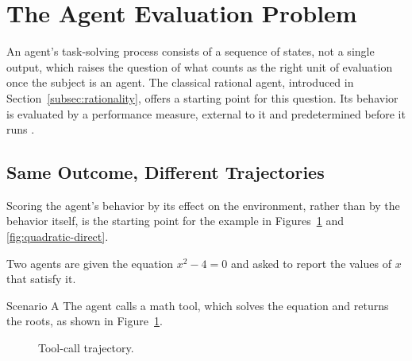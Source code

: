 \section{The Agent Evaluation Problem}
\label{sec:agent-evaluation-problem}

An agent's task-solving process consists of a sequence of states, not a single output, which raises the question of what counts as the right unit of evaluation once the subject is an agent. The classical rational agent, introduced in Section~\ref{subsec:rationality}, offers a starting point for this question. Its behavior is evaluated by a performance measure, external to it and predetermined before it runs \cite[Chap.~2]{russellArtificialIntelligenceModern2022}.

\subsection{Same Outcome, Different Trajectories}
\label{subsec:quadratic-example}

Scoring the agent's behavior by its effect on the environment, rather than by the behavior itself, is the starting point for the example in Figures~\ref{fig:quadratic-tool} and \ref{fig:quadratic-direct}.

\begin{problembox}
  Two agents are given the equation $x^2 - 4 = 0$ and asked to report the values of $x$ that satisfy it.
\end{problembox}

\begin{scenariobox}{Scenario A}
  The agent calls a math tool, which solves the equation and returns the roots, as shown in Figure~\ref{fig:quadratic-tool}.

  \begin{figure}[H]
    \centering
    \caption[Tool-call trajectory]{Tool-call trajectory.}
    \label{fig:quadratic-tool}
  \end{figure}
\end{scenariobox}

